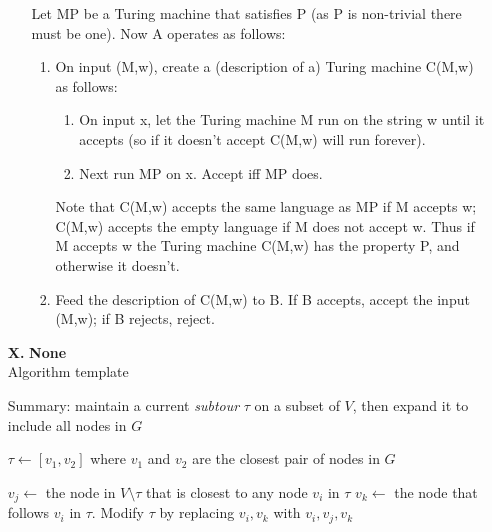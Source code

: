 \begin{enumerate}
\begin{enumerate}[(b)]
{\newline\newline Let MP be a Turing machine that satisfies P (as P is non-trivial there must be one). Now A operates as follows: 
\newline 
\begin{enumerate}[1.]
    \item On input (M,w), create a (description of a) Turing machine C(M,w) as follows:
    \begin{enumerate}
        \item On input x, let the Turing machine M run on the string w until it accepts (so if it doesn't accept C(M,w) will run forever).
        \item Next run MP on x. Accept iff MP does.
    \end{enumerate}

    Note that C(M,w) accepts the same language as MP if M accepts w; C(M,w) accepts the empty language if M does not accept w. 
Thus if M accepts w the Turing machine C(M,w) has the property P, and otherwise it doesn't.
\item Feed the description of C(M,w) to B. If B accepts, accept the input (M,w); if B rejects, reject.
\end{enumerate}}
\end{enumerate}
\answer{}

\pagebreak




\item[\textbf{X.}] \textbf{None} \\
Algorithm template

\begin{algorithm}
\begin{algorithmic}[1]
    \State Summary: maintain a current \textit{subtour} $\tau$ on a subset of $V$, then expand it to include all nodes in $G$
    
    \Statex
        \State $\tau \gets [v_1, v_2]$ where $v_1$ and $v_2$ are the closest pair of nodes in $G$
        
            \State $v_j \gets$ the node in $V \setminus \tau$ that is closest to any node $v_i$ in $\tau$
            \State $v_k \gets$ the node that follows $v_i$ in $\tau$.
            \State Modify $\tau$ by replacing $v_i, v_k$ with $v_i, v_j, v_k$
        \EndWhile
    \EndFunction
\end{algorithmic}
\end{algorithm}

\pagebreak

\end{enumerate}
